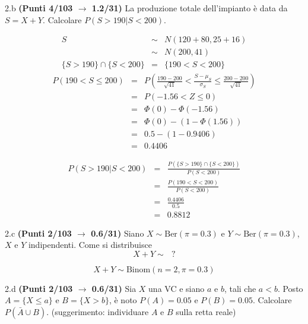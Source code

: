 \documentclass[
  11pt,
]{book}
\theoremstyle{mytheoremstyle}
\theoremstyle{mydefstyle}
\newenvironment{sol}
  {
  \begin{tcolorbox}[enhanced,breakable,arc=0.1mm,boxrule=1pt,colback=white,colframe=iblue,
  title=\bf \fontfamily{lmss}\selectfont \hspace{.5 cm} Soluzione,drop fuzzy shadow]

}{
\end{tcolorbox}
  }
\begin{document}
2.b \textbf{(Punti 4/103 \(\rightarrow\) 1.2/31)} La produzione totale dell'impianto è data da \(S=X+Y\). Calcolare
\(P(S>190|S<200)\).

\begin{sol}
\begin{eqnarray*}
S &\sim& N(120+80,25+16)\\
  &\sim& N(200,41)\\
\{S>190\}\cap \{S<200\} &=& \{190< S< 200\}
\end{eqnarray*}
\begin{eqnarray*}
   P( 190 < S \leq  200 ) &=& P\left( \frac { 190  -  200 }{\sqrt{ 41 }} < \frac { S  -  \mu_S }{ \sigma_S } \leq \frac { 200  -  200 }{\sqrt{ 41 }}\right)  \\
              &=& P\left(  -1.56  < Z \leq  0 \right) \\
              &=& \Phi( 0 )-\Phi( -1.56 )\\
              &=&  \Phi( 0 )-(1-\Phi( 1.56 )) \\ &=&  0.5 -(1- 0.9406 ) \\ 
              &=&  0.4406 
   \end{eqnarray*}

\begin{eqnarray*}
P(S>190|S<200) &=& \frac{P(\{S>190\}\cap \{S<200\})}{P(S<200)}\\
&=& \frac{P(190< S< 200)}{P(S<200)}\\
&=& \frac{0.4406}{0.5}\\
&=& 0.8812
\end{eqnarray*}

\end{sol}

2.c \textbf{(Punti 2/103 \(\rightarrow\) 0.6/31)} Siano \(X\sim \text{Ber}(\pi=0.3)\) e \(Y\sim \text{Ber}(\pi=0.3)\), \(X\) e \(Y\) indipendenti.
Come si distribuisce
\[
X+Y\sim~~~?
\]

\begin{sol}
\[
X+Y\sim \text{Binom}(n=2,\pi=0.3)
\]

\end{sol}

2.d \textbf{(Punti 2/103 \(\rightarrow\) 0.6/31)} Sia \(X\) una VC e siano \(a\) e \(b\), tali che \(a<b\). Posto \(A=\{X\le a\}\) e \(B=\{X > b\}\), è noto \(P(A)=0.05\) e \(P(B)=0.05\). Calcolare \(P(\bar A\cup B)\). (suggerimento: individuare \(A\) e \(B\) sulla retta reale)
\end{document}
